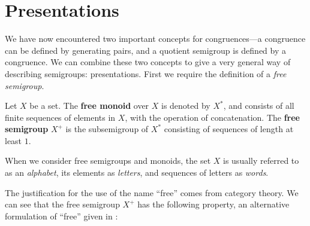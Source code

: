 \section{Presentations}
\label{sec:intro-presentations}

We have now encountered two important concepts for congruences---a congruence
can be defined by generating pairs, and a quotient semigroup is defined by a
congruence.  We can combine these two concepts to give a very general way of
describing semigroups: presentations.  First we require the definition of a
\textit{free semigroup}.

\begin{definition}
  \label{def:free}
  Let $X$ be a set.  The \textbf{free monoid} over $X$ is denoted by $X^*$, and
  consists of all finite sequences of elements in $X$, with the operation of
  concatenation.  The \textbf{free semigroup} $X^+$ is the subsemigroup of $X^*$
  consisting of sequences of length at least $1$.
\end{definition}

When we consider free semigroups and monoids, the set $X$ is usually referred to
as an \textit{alphabet}, its elements as \textit{letters}, and sequences of
letters as \textit{words}.

The justification for the use of the name ``free'' comes from category theory.
We can see that the free semigroup $X^+$ has the following property, an
alternative formulation of ``free'' given in \cite[\S 1.6]{howie}:

